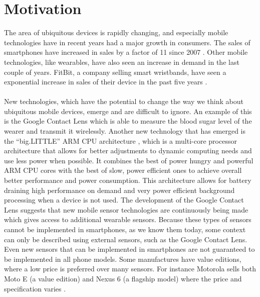
\section{Motivation}
\label{sec:motivation}

The area of ubiquitous devices is rapidly changing, and especially mobile technologies have in recent years had a major growth in consumers. The sales of smartphones have increased in sales by a factor of 11 since 2007 \parencite{statsia_smartphones}. Other mobile technologies, like wearables, have also seen an increase in demand in the last couple of years. FitBit, a company selling smart wristbands, have seen a exponential increase in sales of their device in the past five years \parencite{statsia_fitbit}.
\\\\
New technologies, which have the potential to change the way we think about ubiquitous mobile devices, emerge and are difficult to ignore. An example of this is the Google Contact Lens \parencite{google_contact_lens} which is able to measure the blood sugar level of the wearer and transmit it wirelessly. Another new technology that has emerged is the ``big.LITTLE'' ARM CPU architecture \parencite{big_little_architecture}, which is a multi-core processor architecture that allows for better adjustments to dynamic computing needs and use less power when possible. It combines the best of power hungry and powerful ARM CPU cores with the best of slow, power efficient ones to achieve overall better performance and power consumption. This architecture allows for battery draining high performance on demand and very power efficient background processing when a device is not used. The development of the Google Contact Lens suggests that new mobile sensor technologies are continuously being made which gives access to additional wearable sensors. Because these types of sensors cannot be implemented in smartphones, as we know them today, some context can only be described using external sensors, such as the Google Contact Lens. Even new sensors that can be implemented in smartphones are not guaranteed to be implemented in all phone models. Some manufactures have value editions, where a low price is preferred over many sensors. For instance Motorola sells both Moto E (a value edition) and Nexus 6 (a flagship model) where the price and specification varies \parencite{moto_e_compared_to_nexus_6}.
